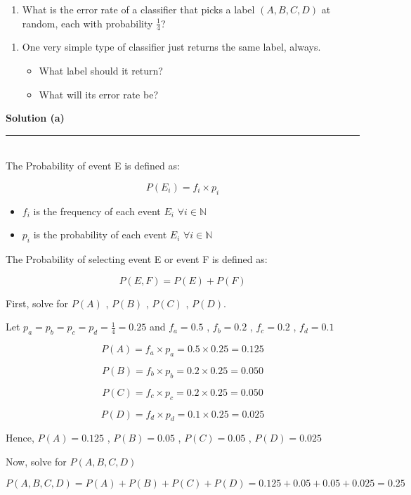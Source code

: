 \documentclass{article}
\begin{document}
 \begin{enumerate}[label=(a)]
  \item What is the error rate of a classifier that picks a label $(A, B, C, D)$ at random, each with probability $\frac{1}{4}$?\\
\end{enumerate}
\begin{enumerate}[label=(b)]
  \item One very simple type of classifier just returns the same label, always.
    \begin{itemize}
        \item What label should it return?
        \item What will its error rate be?
    \end{itemize}
\end{enumerate}


\textbf{Solution (a)} 

\noindent\rule{\textwidth}{0.4pt}\\

The Probability of event E is defined as:

$$P(E_i) = f_i \times p_i$$
\begin{itemize}
    \item $f_i$ is the frequency of each event $E_i$ $\forall i \in \mathbb{N}$
    \item $p_i$ is the probability of each event $E_i$ $\forall i \in \mathbb{N}$
\end{itemize}
   
The Probability of selecting event E or event F is defined as:

$$P(E,F) = P(E)+P(F)$$

First, solve for $P(A)$ , $P(B)$ , $P(C)$ , $P(D)$.

Let $p_a = p_b = p_c = p_d = \frac{1}{4} = 0.25$ and $f_a = 0.5$ , $f_b = 0.2$ , $f_c= 0.2$ , $f_d = 0.1$  

$$P(A) = f_a \times p_a = 0.5 \times 0.25 = 0.125$$

$$P(B) = f_b \times p_b = 0.2 \times 0.25 = 0.050$$

$$P(C) = f_c \times p_c = 0.2 \times 0.25 = 0.050$$

$$P(D) = f_d \times p_d = 0.1 \times 0.25 = 0.025$$

Hence, $P(A)=0.125$ , $P(B)=0.05$ , $P(C)=0.05$ , $P(D)=0.025$

Now, solve for $P(A,B,C,D)$

$$P(A,B,C,D) = P(A) + P(B) + P(C) + P(D) = 0.125+0.05+0.05+0.025 = 0.25$$
\end{document}
